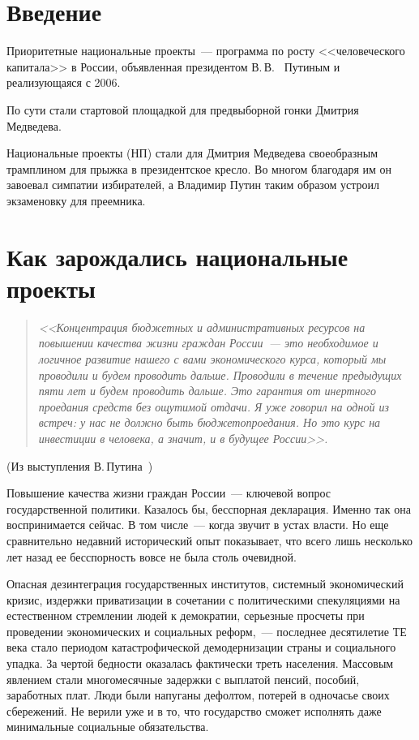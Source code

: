 \documentclass[article, 12pt, russian, oneside]{ncc}
\begin{document}
 \thispagestyle{empty}
\tableofcontents
\newpage

\section*{Введение}

Приоритетные национальные проекты~--- программа по росту
<<человеческого капитала>> в России, объявленная президентом В.\,В.~
Путиным и реализующаяся с 2006.

По сути стали стартовой площадкой для предвыборной гонки Дмитрия
Медведева.

Национальные проекты (НП) стали для Дмитрия Медведева своеобразным
трамплином для прыжка в президентское кресло. Во многом благодаря им
он завоевал симпатии избирателей, а Владимир Путин таким образом
устроил экзаменовку для преемника.
\newpage

\section{Как зарождались национальные проекты}

\begin{quote}
  \emph{<<Концентрация бюджетных и административных ресурсов на
    повышении качества жизни граждан России~--- это необходимое и
    логичное развитие нашего с вами экономического курса, который мы
    проводили и будем проводить дальше. Проводили в течение предыдущих
    пяти лет и будем проводить дальше. Это гарантия от инертного
    проедания средств без ощутимой отдачи. Я уже говорил на одной из
    встреч: у нас не должно быть бюджетопроедания. Но это курс на
    инвестиции в человека, а значит, и в будущее России>>.}
\end{quote}
\begin{flushright}
  (Из выступления В.\,Путина~\cite{Putin_RG})
\end{flushright}

Повышение качества жизни граждан России~--- ключевой вопрос
государственной политики. Казалось бы, бесспорная декларация. Именно
так она воспринимается сейчас. В том числе~--- когда звучит в устах
власти. Но еще сравнительно недавний исторический опыт показывает, что
всего лишь несколько лет назад ее бесспорность вовсе не была столь
очевидной.

Опасная дезинтеграция государственных институтов, системный
экономический кризис, издержки приватизации в сочетании с
политическими спекуляциями на естественном стремлении людей к
демократии, серьезные просчеты при проведении экономических и
социальных реформ,~--- последнее десятилетие ТЕ века стало периодом
катастрофической демодернизации страны и социального упадка. За чертой
бедности оказалась фактически треть населения. Массовым явлением стали
многомесячные задержки с выплатой пенсий, пособий, заработных
плат. Люди были напуганы дефолтом, потерей в одночасье своих
сбережений. Не верили уже и в то, что государство сможет исполнять
даже минимальные социальные обязательства.
\end{document}
